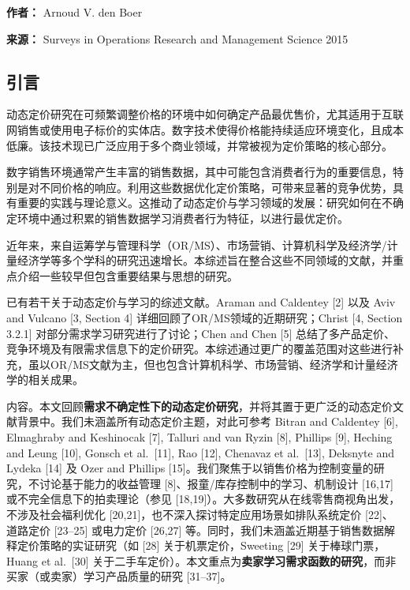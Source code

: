 \textbf{作者：} Arnoud V. den Boer

\textbf{来源：} Surveys in Operations Research and Management Science 2015



\subsection{引言}\label{introduction}

动态定价研究在可频繁调整价格的环境中如何确定产品最优售价，尤其适用于互联网销售或使用电子标价的实体店。数字技术使得价格能持续适应环境变化，且成本低廉。该技术现已广泛应用于多个商业领域，并常被视为定价策略的核心部分。

数字销售环境通常产生丰富的销售数据，其中可能包含消费者行为的重要信息，特别是对不同价格的响应。利用这些数据优化定价策略，可带来显著的竞争优势，具有重要的实践与理论意义。这推动了动态定价与学习领域的发展：研究如何在不确定环境中通过积累的销售数据学习消费者行为特征，以进行最优定价。

近年来，来自运筹学与管理科学（OR/MS）、市场营销、计算机科学及经济学/计量经济学等多个学科的研究迅速增长。本综述旨在整合这些不同领域的文献，并重点介绍一些较早但包含重要结果与思想的研究。

已有若干关于动态定价与学习的综述文献。Araman and Caldentey [2] 以及 Aviv and Vulcano [3, Section 4] 详细回顾了OR/MS领域的近期研究；Christ [4, Section 3.2.1] 对部分需求学习研究进行了讨论；Chen and Chen [5] 总结了多产品定价、竞争环境及有限需求信息下的定价研究。本综述通过更广的覆盖范围对这些进行补充，虽以OR/MS文献为主，但也包含计算机科学、市场营销、经济学和计量经济学的相关成果。

内容。本文回顾\textbf{需求不确定性下的动态定价研究}，并将其置于更广泛的动态定价文献背景中。我们未涵盖所有动态定价主题，对此可参考 Bitran and Caldentey [6], Elmaghraby and Keshinocak [7], Talluri and van Ryzin [8], Phillips [9], Heching and Leung [10], Gonsch et al.~[11], Rao [12], Chenavaz et al.~[13], Deksnyte and Lydeka [14] 及 Ozer and Phillips [15]。我们聚焦于以销售价格为控制变量的研究，不讨论基于能力的收益管理 [8]、报童/库存控制中的学习、机制设计 [16,17] 或不完全信息下的拍卖理论（参见 [18,19]）。大多数研究从在线零售商视角出发，不涉及社会福利优化 [20,21]，也不深入探讨特定应用场景如排队系统定价 [22]、道路定价 [23–25] 或电力定价 [26,27] 等。同时，我们未涵盖近期基于销售数据解释定价策略的实证研究（如 [28] 关于机票定价，Sweeting [29] 关于棒球门票，Huang et al.~[30] 关于二手车定价）。本文重点为\textbf{卖家学习需求函数的研究}，而非买家（或卖家）学习产品质量的研究 [31–37]。


